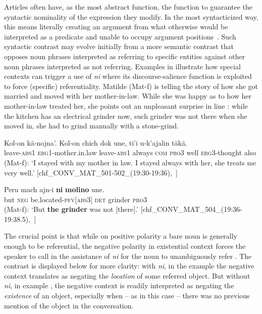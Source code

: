 \documentclass[output=paper
,modfonts
,nonflat]{langsci/langscibook}
\begin{document}
Articles often have, as the most abstract function, the function to guarantee the syntactic nominality of the expression they modify. In the most syntacticized way, this means literally creating an argument from what otherwise would be interpreted as a predicate and unable to occupy argument positions~\citep[176]{Gillon2015}. Such syntactic contrast may evolve initially from a more semantic contrast that opposes noun phrases interpreted as referring to specific entities against other noun phrases interpreted as not referring.
Examples in  illustrate how special contexts can trigger a use of \textit{ni} where its discourse-salience function is exploited to force (specific) referentiality. Matilde (Mat-f) is telling the story of how she got married and moved with her mother-in-law. While she was happy as to how her mother-in-law treated her, she points out an unpleasant surprise in line : while the kitchen has an electrical grinder now, such grinder was not there when she moved in, she had to grind manually with a stone-grind.


\ea \label{ex:pico:56}

\ea \label{ex:pico:56a}
\gll Kol-on kä-nojna'. Kol-on chich dok une, ti'i u-k'ajalin täkä.\\
leave-{\textsc{abs1}} {\textsc{erg1}}-mother.in.law leave-{\textsc{abs1}} always {\textsc{com}} \textsc{pro3} well {\textsc{erg3}}-thought also\\
\glt (Mat-f): `I stayed with my mother in law. I stayed always with her, she treats me very well.' [chf\_CONV\_MAT\_501-502\_(19:30-19:36),~\citealt{Delgado-Galvan2018archive}]

\ex \label{ex:pico:56b}
\gll Peru mach ajn-i \textbf{ni} \textbf{molino} une.
\\
but \textsc{neg} be.located-{\textsc{pfv[abs3]}} \textsc{det} grinder {\textsc{pro3}}\\
\glt (Mat-f): `But \textbf{the grinder} was not [there].' [chf\_CONV\_MAT\_504\_(19:36-19:38.5),~\citealt{Delgado-Galvan2018archive}]
\z
\z

The crucial point is that while on positive polarity a bare noun is generally enough to be referential, the negative polarity in existential context forces the speaker to call in the assistance of \textit{ni} for the noun to unambiguously refer . The contrast is displayed below for more clarity: with \textit{ni}, in the example  the negative context translates as negating the \textit{location} of some referred object. But without \textit{ni}, in example , the negative context is readily interpreted as negating the \textit{existence} of an object, especially when -- as in this case -- there was no previous mention of the object in the conversation.
\end{document}
